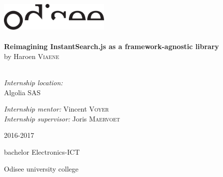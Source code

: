 \begin{titlepage}
\begin{center}
\includegraphics[width=0.4\textwidth]{./assets/logo.pdf}~\\[1cm]

\HRule \\[0.4cm]
{ \LARGE \bfseries Reimagining InstantSearch.js as a framework-agnostic library}\\[0.4cm]
{by Haroen \textsc{Viaene}}\\[0.2cm]

\HRule \\[1.5cm]

\begin{minipage}{0.49\textwidth}
\begin{flushleft} \large
\emph{Internship location:}\\
Algolia SAS\\

\end{flushleft}
\end{minipage}
\begin{minipage}{0.49\textwidth}
\begin{flushright} \large
\emph{Internship mentor:}
Vincent \textsc{Voyer}\\
\emph{Internship supervisor:}
Joris \textsc{Maervoet}\\
\end{flushright}
\end{minipage}

\vfill

{\large 2016-2017}

{\large{bachelor Electronics-ICT}}

{\large Odisee university college}

\end{center}
\end{titlepage}
